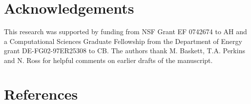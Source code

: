 \documentclass[authoryear,5p]{elsarticle}
\begin{document}
 \section{Acknowledgements}
This research was supported by funding from NSF Grant EF 0742674 to AH
and a Computational Sciences Graduate Fellowship from the Department of
Energy grant DE-FG02-97ER25308 to CB. The authors thank M. Baskett, 
T.A. Perkins and N. Ross for helpful comments on earlier drafts of the
manuscript.  

 \section{References}%
 
 
\end{document}
